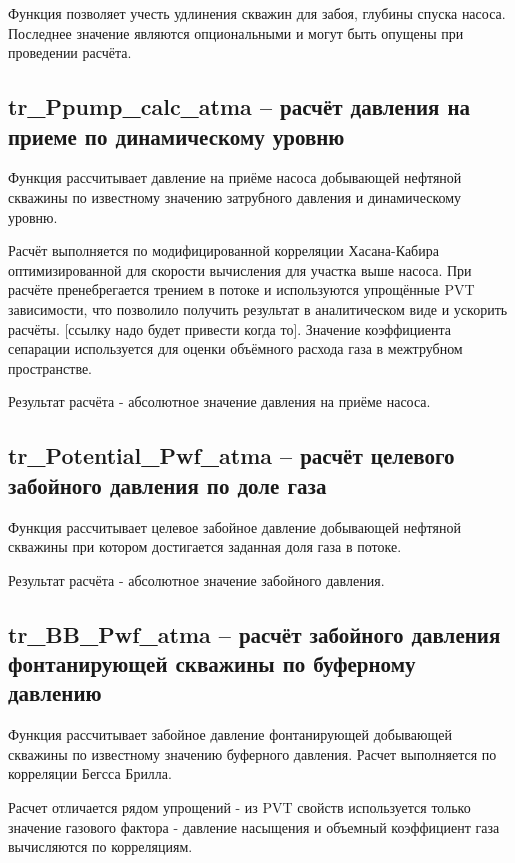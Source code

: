 \documentclass[]{scrreprt}
\begin{document}
Функция позволяет учесть удлинения скважин для забоя, глубины спуска насоса. Последнее значение являются опциональными и могут быть опущены при проведении расчёта. 


\subsection{tr\_Ppump\_calc\_atma – расчёт давления на приеме по динамическому уровню}
Функция рассчитывает давление на приёме насоса добывающей нефтяной скважины по известному значению затрубного давления и динамическому уровню. 

Расчёт выполняется по модифицированной корреляции Хасана-Кабира оптимизированной для скорости вычисления для участка выше насоса. При расчёте пренебрегается трением в потоке и используются упрощённые PVT зависимости, что позволило получить результат в аналитическом виде и ускорить расчёты. [ссылку надо будет привести когда то]. Значение коэффициента сепарации используется для оценки объёмного расхода газа в межтрубном пространстве. 

Результат расчёта - абсолютное значение давления на приёме насоса. 



\subsection{tr\_Potential\_Pwf\_atma – расчёт целевого забойного давления по доле газа}
Функция рассчитывает целевое забойное давление добывающей нефтяной скважины при котором достигается заданная доля газа в потоке.

Результат расчёта - абсолютное значение забойного давления. 

\subsection{tr\_BB\_Pwf\_atma – расчёт забойного давления фонтанирующей скважины по буферному давлению}
Функция рассчитывает забойное давление фонтанирующей добывающей скважины по известному значению буферного давления. Расчет выполняется по корреляции Бегсса Брилла. 

Расчет отличается рядом упрощений - из PVT свойств используется только значение газового фактора - давление насыщения и объемный коэффициент газа вычисляются по корреляциям. 
\end{document}
